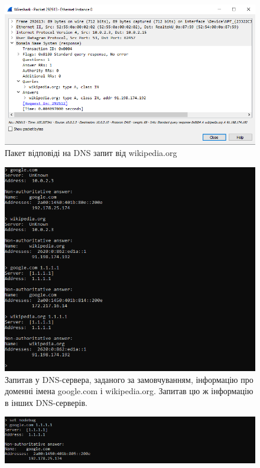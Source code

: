 \documentclass{article}
\begin{document}
\begin{normalsize}
\begin{figure}[H]
	\centering
	\includegraphics[width=\textwidth]{22}
	\caption{Пакет відповіді на DNS запит від wikipedia.org}
\end{figure}

\begin{figure}[H]
	\centering
	\includegraphics[width=\textwidth]{31}
	\caption{Запитав у DNS-сервера, заданого за замовчуванням, інформацію про доменні імена google.com і wikipedia.org. Запитав цю ж інформацію в інших DNS-серверів.}
\end{figure}

\begin{figure}[H]
	\centering
	\includegraphics[width=\textwidth]{32}
	\caption{}
\end{figure}


\end{normalsize}
\end{document}
